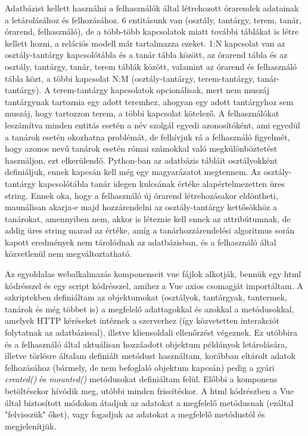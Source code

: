 Adatbázist kellett használni a felhasználók által létrehozott órarendek adatainak a letárolásához és felhozásához. 6 entitásunk van (osztály, tantárgy, terem, tanár, órarend, felhasználó), de a több-több kapcsolatok miatt további táblákat is létre kellett hozni, a relációs modell már tartalmazza ezeket. 1:N kapcsolat van az osztály-tantárgy kapcsolótábla és a tanár tábla között, az órarend tábla és az osztály, tantárgy, tanár, terem táblák között, valamint az órarend és felhasználó tábla közt, a többi kapcsolat N:M (osztály-tantárgy, terem-tantárgy, tanár-tantárgy). A terem-tantárgy kapcsolatok opcionálisak, mert nem muszáj tantárgynak tartoznia egy adott teremhez, ahogyan egy adott tantárgyhoz sem muszáj, hogy tartozzon terem, a többi kapcsolat kötelező. A felhasználókat leszámítva minden entitás esetén a név szolgál egyedi azonosítóként, ami egyedül a tanárok esetén okozhatna problémát, de felhívjuk rá a felhasználó figyelmét, hogy azonos nevű tanárok esetén római számokkal való megkülönböztetést használjon, ezt elkerülendő. Python-ban az adatbázis tábláit osztályokként definiáljuk, ennek kapcsán kell még egy magyarázatot megtennem. Az osztály-tantárgy kapcsolótábla tanár idegen kulcsának értéke alapértelmezetten üres string. Ennek oka, hogy a felhasználó új órarend létrehozásakor eldöntheti, maunálisan akarja-e majd hozzárendelni az osztály-tantárgy kettősökhöz a tanárokat, amennyiben nem, akkor is léteznie kell ennek az attribútumnak, de addig üres string marad az értéke, amíg a tanárhozzárendelési algoritmus során kapott eredmények nem tárolódnak az adatbázisban, és a felhasználó által közvetlenül nem megváltoztatható.


Az egyoldalas webalkalmazás komponenseit vue fájlok alkotják, bennük egy html kódrésszel és egy script kódrésszel, amihez a Vue axios csomagját importáltam. A szkriptekben definiáltam az objektumokat (osztályok, tantárgyak, tantermek, tanárok és még többet is) a megfelelő adattagokkal és azokkal a metódusokkal, amelyek HTTP kéréseket intéznek a szerverhez (így közvetetten interakciót folytatnak az adatbázissal), illetve kliensoldali ellenőrzést végeznek. Ez utóbbira és a felhasználó által aktuálisan hozzáadott objektum példányok letárolására, illetve törlésre általam definiált metódust használtam, korábban eltárolt adatok felhozásához (bármely, de nem befoglaló objektum kapcsán) pedig a gyári \textit{created()} és \textit{mounted()} metódusokat definiáltam felül. Előbbi a komponens betöltésekor hívódik meg, utóbbi minden frissítéskor. A html kódrészben a Vue által biztosított módokon átadjuk az adatokat a megfelelő metódusnak (ezáltal "felvisszük" őket), vagy fogadjuk az adatokat a megfelelő metódustól és megjelenítjük.

